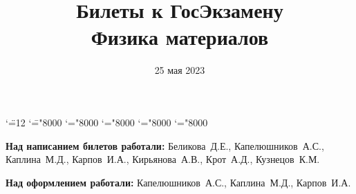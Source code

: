 \documentclass[a4paper, 12pt]{article} %
\begin{document}

\begingroup \catcode`\"=12
\gdef\newmcodes@{\mathcode`\'39\mathcode`\*42\mathcode`\."613A%
\mathcode`\-"8000\mathcode`\/47\mathcode`\:"603A\relax}%
\endgroup
\mathcode`\=="8000 \mathcode`\+="8000 \mathcode`\-="8000
\mathcode`\<="8000 \mathcode`\>="8000

\graphicspath{{images/}}

\title{Билеты к ГосЭкзамену \\ Физика материалов}
\date{25 мая 2023}

\maketitle

\pagebreak
\hspace{0pt}
\vfill
\begin{center}
    \textbf{Над написанием билетов работали:} \mbox{Беликова Д.Е.}, \mbox{Капелюшников А.С.}, \mbox{Каплина М.Д.}, \mbox{Карпов И.А.}, \mbox{Кирьянова А.В.}, \mbox{Крот А.Д.}, \mbox{Кузнецов К.М.}

    \textbf{Над оформлением работали:} \mbox{Капелюшников А.С.}, \mbox{Каплина М.Д.}, \mbox{Карпов И.А.}
\end{center}

\vfill
\hspace{0pt}
\pagebreak

\tableofcontents











\end{document}
